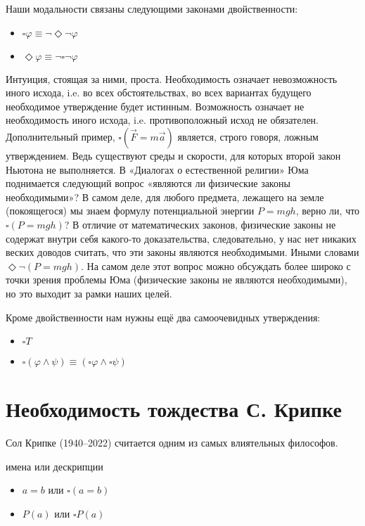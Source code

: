 \documentclass[openany]{book}
\theoremstyle{plain}
\theoremstyle{definition}
\begin{document}
Наши модальности связаны следующими законами двойственности:
\begin{itemize}
    \item \(\square \varphi \equiv \neg \Diamond \neg \varphi\)
    \item \(\Diamond \varphi \equiv \neg \square \neg \varphi\)
\end{itemize}

Интуиция, стоящая за ними, проста. Необходимость означает невозможность иного исхода, i.e. во всех обстоятельствах, во всех вариантах будущего необходимое утверждение будет истинным. Возможность означает не необходимость иного исхода, i.e. противоположный исход не обязателен. Дополнительный пример, \(\square(\vec{F} = m \vec{a})\) является, строго говоря, ложным утверждением. Ведь существуют среды и скорости, для которых второй закон Ньютона не выполняется. В «Диалогах о естественной религии» Юма поднимается следующий вопрос «являются ли физические законы необходимыми»? В самом деле, для любого предмета, лежащего на земле (покоящегося) мы знаем формулу потенциальной энергии \(P = mgh\), верно ли, что \(\square(P = mgh)\)? В отличие от математических законов, физические законы не содержат внутри себя какого-то доказательства, следовательно, у нас нет никаких веских доводов считать, что эти законы являются необходимыми. Иными словами \(\Diamond \neg(P = mgh)\). На самом деле этот вопрос можно обсуждать более широко с точки зрения проблемы Юма (физические законы не являются необходимыми), но это выходит за рамки наших целей.

Кроме двойственности нам нужны ещё два самоочевидных утверждения:
\begin{itemize}
    \item \(\square T\)
    \item \(\square (\varphi \land \psi) \equiv (\square \varphi \land \square \psi)\)
\end{itemize}

\section{Необходимость тождества С. Крипке}

Сол Крипке (1940--2022) считается одним из самых влиятельных философов. 

имена или дескрипции
\begin{itemize}
    \item \(a = b\) или \(\square(a = b)\)
    \item \(P(a)\) или \(\square P(a)\)
\end{itemize}
\end{document}
